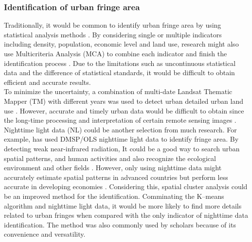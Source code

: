\subsubsection{Identification of urban fringe area}
Traditionally, it would be common to identify urban fringe area by using statistical analysis methods \parencite{beibei_review_2012}. By considering single or multiple indicators including density, population, economic level and land use, research might also use Multicriteria Analysis (MCA) to combine each indicator and finish the identification process \parencite{yang_spatial_2017}. Due to the limitations such as uncontinuous statistical data and the difference of statistical standards, it would be difficult to obtain efficient and accurate results.\\

To minimize the uncertainty, a combination of multi-date Landsat Thematic Mapper (TM) with different years was used to detect urban detailed urban land use \parencite{turker_land_2005}. However, accurate and timely urban data would be difficult to obtain since the long-time processing and interpretation of certain remote sensing images \parencite{li_urban_2019}. Nighttime light data (NL) could be another selection from much research. For example, \textcite{feng_using_2020} has used DMSP/OLS nighttime light data to identify fringe area. By detecting weak near-infrared radiation, It could be a good way to search urban spatial patterns, and human activities and also recognize the ecological environment and other fields \parencite{bennett_advances_2017}. However, only using nighttime data might accurately estimate spatial patterns in advanced countries but perform less accurate in developing economies \parencite{zhang_can_2013}. Considering this, spatial cluster analysis could be an improved method for the identification. Comminating the K–means algorithm and nighttime light data, it would be more likely to find more details related to urban fringes when compared with the only indicator of nighttime data identification. The method was also commonly used by scholars because of its convenience and versatility.\\


